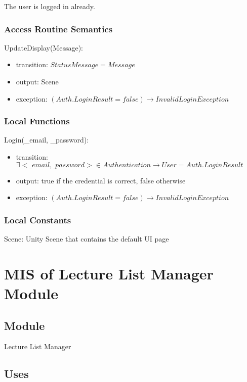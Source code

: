 \documentclass[12pt, titlepage]{article}
\begin{document}
The user is logged in already.

\subsubsection{Access Routine Semantics}

\noindent UpdateDisplay(Message):
\begin{itemize}
\item transition: $StatusMessage = Message$ 
\item output: Scene
\item exception: $(Auth.LoginResult = false) \rightarrow InvalidLoginException$
\end{itemize}

\subsubsection{Local Functions}

\noindent Login(\_email, \_password):
\begin{itemize}
\item transition: $\exists <\_email, \_password> \in Authentication \rightarrow User = Auth.LoginResult$ 
\item output: true if the credential is correct, false otherwise
\item exception: $(Auth.LoginResult = false) \rightarrow InvalidLoginException$
\end{itemize}

\subsubsection{Local Constants}

Scene: Unity Scene that contains the default UI page

\newpage

\section{MIS of Lecture List Manager Module} \label{mLL}

\subsection{Module}

Lecture List Manager

\subsection{Uses}
\end{document}
